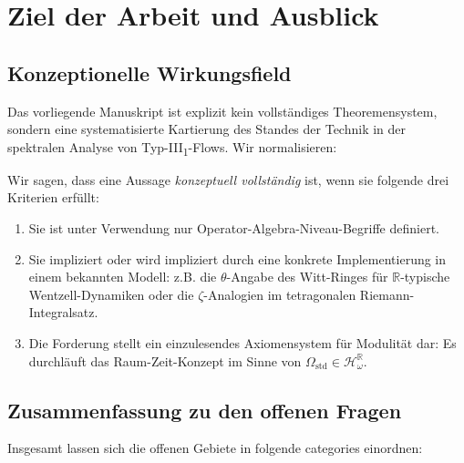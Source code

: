 \section{Ziel der Arbeit und Ausblick}

\subsection{Konzeptionelle Wirkungsfield}
Das vorliegende Manuskript ist explizit kein vollständiges Theoremensystem, sondern eine systematisierte Kartierung des Standes der Technik in der spektralen Analyse von Typ-III\textsubscript{1}-Flows. Wir normalisieren:

\begin{definition}[Wirkungsfelder]
Wir sagen, dass eine Aussage \emph{konzeptuell vollständig} ist, wenn sie folgende drei Kriterien erfüllt:
\begin{enumerate}[label=(\alph*)]
\item Sie ist unter Verwendung nur Operator-Algebra-Niveau-Begriffe definiert.
\item Sie impliziert oder wird impliziert durch eine konkrete Implementierung in einem bekannten Modell: z.B. die \(\theta\)-Angabe des Witt-Ringes für \(\mathbb{R}\)-typische Wentzell-Dynamiken oder die \(\zeta\)-Analogien im tetragonalen Riemann-Integralsatz.
\item Die Forderung stellt ein einzulesendes Axiomensystem für Modulität dar: Es durchläuft das Raum-Zeit-Konzept im Sinne von \(\Omega_{\text{std}} \in \mathcal{H}_{\omega}^{\mathbb{R}}\).
\end{enumerate}
\end{definition}

\subsection{Zusammenfassung zu den offenen Fragen}
Insgesamt lassen sich die offenen Gebiete in folgende categories einordnen:

